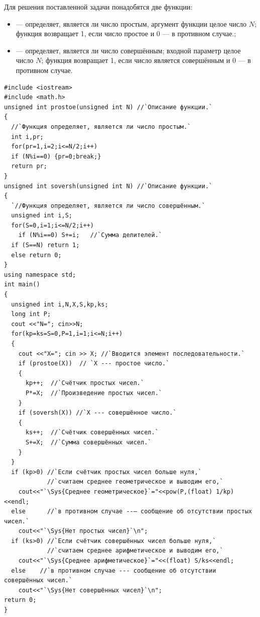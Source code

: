Для решения поставленной задачи понадобятся две функции: 
\begin{itemize}
\item {} --- определяет, является ли число простым, аргумент функции целое число
$N$; функция возвращает 1, если число простое и 0 --- в противном
случае.;

\item {} --- определяет, является ли число совершённым; входной параметр целое число
$N$; функция возвращает 1, если число является совершённым и 0 --- в
противном случае.
\end{itemize}
\begin{lstlisting}
#include <iostream>
#include <math.h>
unsigned int prostoe(unsigned int N) //`Описание функции.`
{
  //`Функция определяет, является ли число простым.`
  int i,pr;
  for(pr=1,i=2;i<=N/2;i++)
  if (N%i==0) {pr=0;break;}
  return pr;
}
unsigned int soversh(unsigned int N) //`Описание функции.`
{
  `//Функция определяет, является ли число совершённым.`
  unsigned int i,S;
  for(S=0,i=1;i<=N/2;i++)
    if (N%i==0) S+=i; 	//`Сумма делителей.`
  if (S==N) return 1;
  else return 0;
}
using namespace std;
int main()
{
  unsigned int i,N,X,S,kp,ks;
  long int P;
  cout <<"N="; cin>>N;
  for(kp=ks=S=0,P=1,i=1;i<=N;i++)
  {
    cout <<"X="; cin >> X; //`Вводится элемент последовательности.`
    if (prostoe(X))  // `X --- простое число.`		
    {
      kp++;  //`Счётчик простых чисел.`
      P*=X;  //`Произведение простых чисел.`
    }
    if (soversh(X)) //`X --- совершённое число.`
    {
      ks++;  //`Счётчик совершённых чисел.`
      S+=X;  //`Сумма совершённых чисел.`
    }
  }
  if (kp>0) //`Если счётчик простых чисел больше нуля,`
            //`считаем среднее геометрическое и выводим его,`
    cout<<"`\Sys{Среднее геометрическое}`="<<pow(P,(float) 1/kp)<<endl;
  else      //`в противном случае --– сообщение об отсутствии простых чисел.`
    cout<<"`\Sys{Нет простых чисел}`\n";
  if (ks>0) //`Если счётчик совершённых чисел больше нуля,` 
            //`считаем среднее арифметическое и выводим его,`
    cout<<"`\Sys{Среднее арифметическое}`="<<(float) S/ks<<endl;
  else    //`в противном случае --- сообщение об отсутствии совершённых чисел.`
    cout<<"`\Sys{Нет совершённых чисел}`\n";
return 0;
}
\end{lstlisting}


